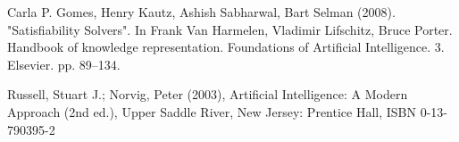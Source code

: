 \begin{thebibliography}{99}
Carla P. Gomes, Henry Kautz, Ashish Sabharwal, Bart Selman (2008). "Satisfiability Solvers". In Frank Van Harmelen, Vladimir Lifschitz, Bruce Porter. Handbook of knowledge representation. Foundations of Artificial Intelligence. 3. Elsevier. pp. 89–134.

Russell, Stuart J.; Norvig, Peter (2003), Artificial Intelligence: A Modern Approach (2nd ed.), Upper Saddle River, New Jersey: Prentice Hall, ISBN 0-13-790395-2

\end{thebibliography}